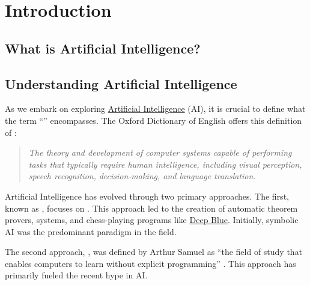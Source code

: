 \chapter{Introduction}

\section{What is Artificial Intelligence?}
\section{Understanding Artificial Intelligence}
As we embark on exploring \href{https://en.wikipedia.org/wiki/Artificial_intelligence}{Artificial Intelligence}
(AI), it is crucial to define what the term ``'' encompasses. The Oxford
Dictionary of English offers this definition  of : 
\begin{quote}
\colorbox{sepia}{\textsl{The theory and development of computer systems capable of performing tasks that}} \linebreak
\colorbox{sepia}{\textsl{typically require human intelligence, including visual perception, speech recognition,}} \linebreak
\colorbox{sepia}{\textsl{decision-making, and language translation.}}
\end{quote}
Artificial Intelligence has evolved through two primary approaches. The first, known as , focuses on .  This approach led to the creation of automatic theorem provers,  systems, and chess-playing programs like \href{https://en.wikipedia.org/wiki/Deep_Blue_(chess_computer)}{Deep Blue}. Initially, symbolic AI was the predominant paradigm in the field.

The second approach, , was defined by Arthur Samuel as ``the field of study that enables
computers to learn without explicit programming'' \cite{samuel:1959}.  This
approach has primarily fueled the recent hype in AI. 

